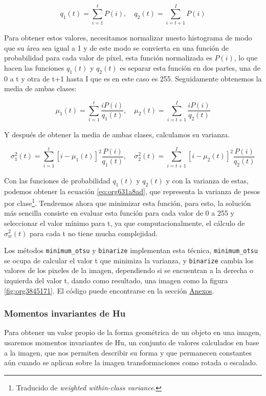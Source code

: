 \documentclass[letter]{article}
\begin{document}
$$ q_1(t) = \sum_{i=1}^t P(i), \quad q_2(t) = \sum_{i=t+1}^I P(i) $$

Para obtener estos valores, necesitamos normalizar nuesto histograma de modo que
su área sea igual a 1 y de este modo se convierta en una función de probabilidad
para cada valor de píxel, esta función normalizada es \(P(i)\), lo que hacen las
funciones \(q_1(t)\) y \(q_2(t)\) es separar esta función en dos partes, una de 0 a
t y otra de t+1 hasta I que es en este caso es 255. Seguidamente obtenemos la
media de ambas clases:

$$ \mu_1(t) = \sum_{i=1}^t \frac{i P(i)}{q_1(t)} , \quad \mu_2(t) = \sum_{i=t+1}^I \frac{i P(i)}{q_2(t)} $$

Y después de obtener la media de ambas clases, calculamos su varianza.

$$ \sigma_1^2(t) = \sum_{i=1}^t [i-\mu_1(t)]^2 \frac{P(i)}{q_1(t)} , \quad \sigma_2^2(t) = \sum_{i=t+1}^I [i-\mu_2(t)]^2 \frac{P(i)}{q_2(t)} $$

Con las funciones de probabilidad \(q_1(t)\) y \(q_2(t)\) y con la varianza de
estas, podemos obtener la ecuación \ref{eq:org631a8ad}, que representa la varianza de
pesos por clase\footnote{Traducido de \emph{weighted within-class variance}.}. Tendremos ahora que minimizar esta función,
para esto, la solución más sencilla consiste en evaluar esta función para cada
valor de 0 a 255 y seleccionar el valor mínimo para t, ya que
computacionalmente, el cálculo de \(\sigma_w^2(t)\) para cada t no tiene mucha
complejidad.

Los métodos \texttt{minimum\_otsu} y \texttt{binarize} implementan esta técnica, \texttt{minimum\_otsu}
se ocupa de calcular el valor t que minimiza la varianza, y \texttt{binarize} cambia
los valores de los pixeles de la imagen, dependiendo si se encuentran a la
derecha o izquierda del valor t, dando como resultado, una imagen como la figura
\ref{fig:org3845171}. El código puede encontrarse en la sección \hyperref[sec:org30d72a7]{Anexos}.

\subsubsection{Momentos invariantes de Hu}
\label{sec:org5b3e1a6}
Para obtener un valor propio de la forma geométrica de un objeto en una imagen,
usaremos momentos invariantes de Hu, un conjunto de valores calculados en base a
la imagen, que nos permiten describir su forma y que permanecen constantes aún
cuando se aplican sobre la imagen transformaciones como rotada o escalado.
\end{document}
